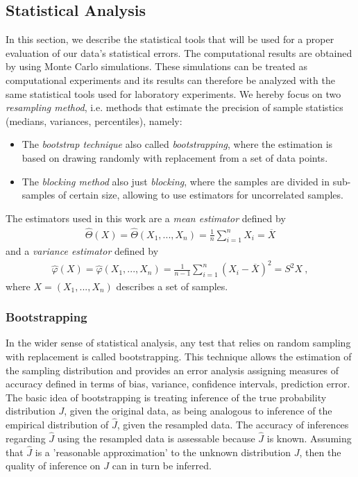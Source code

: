 \documentclass[11pt,a4paper]{article}
\numberwithin{equation}{section}
\begin{document}
  
\subsection{Statistical Analysis}
%
%
%
In this section, we describe the statistical tools that will be used for a proper evaluation of our data's statistical errors.
%
The computational results are obtained by using Monte Carlo simulations.
%
These simulations can be treated as computational experiments and its results can therefore be analyzed with the same statistical tools used for laboratory experiments.
%
We hereby focus on two {\it resampling method}, i.e. methods that estimate the precision of sample statistics (medians, variances, percentiles), namely:
\begin{itemize}
\item The \textit{bootstrap technique} also called \textit{bootstrapping}, where the estimation is based on drawing randomly with replacement from a set of data points.
\item The \textit{blocking method} also just \textit{blocking}, where the samples are divided in sub-samples of certain size, allowing to use estimators for uncorrelated samples. 
\end{itemize}
%
The estimators used in this work are a {\it mean estimator} defined by 
\begin{align*}
\hat \Theta(X)= \hat \Theta(X_1,...,X_n) = \frac{1}{n}\sum_{i=1}^nX_i=\overline{X}
\end{align*}
and a {\it variance estimator} defined by 
\begin{align*}
\hat \varphi(X)=\hat \varphi(X_1,...,X_n) = \frac{1}{n-1}\sum_{i=1}^n(X_i-\overline{X})^2=S^2X~,
\end{align*}
where $X= (X_1,...,X_n)$ describes a set of samples.
\subsubsection{Bootstrapping}
%
%
In the wider sense of statistical analysis, any test that relies on random sampling with replacement is called bootstrapping.
%
This technique allows the estimation of the sampling distribution and provides an error analysis assigning measures of accuracy defined in terms of bias, variance, confidence intervals, prediction error.  
%
The basic idea of bootstrapping is treating inference of the true probability distribution $J$, given the original data, as being analogous to inference of the empirical distribution of $\hat J$, given the resampled data.
%
The accuracy of inferences regarding $\hat J$ using the resampled data is assessable because $\hat J$ is known. 
%
Assuming that $\hat J$ is a 'reasonable approximation' to the unknown distribution $J$, then the quality of inference on $J$ can in turn be inferred.
\end{document}

